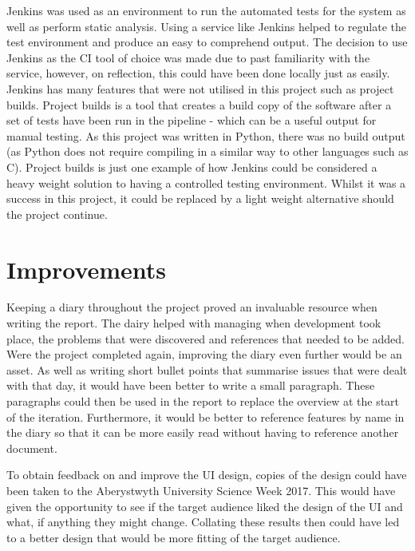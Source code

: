 Jenkins was used as an environment to run the automated tests for the system as well as perform static analysis. Using a service like Jenkins helped to regulate the test environment and produce an easy to comprehend output. The decision to use Jenkins as the CI tool of choice was made due to past familiarity with the service, however, on reflection, this could have been done locally just as easily. Jenkins has many features that were not utilised in this project such as project builds. Project builds is a tool that creates a build copy of the software after a set of tests have been run in the pipeline - which can be a useful output for manual testing. As this project was written in Python, there was no build output (as Python does not require compiling in a similar way to other languages such as C). Project builds is just one example of how Jenkins could be considered a heavy weight solution to having a controlled testing environment. Whilst it was a success in this project, it could be replaced by a light weight alternative should the project continue.

\newpage

\section{Improvements}
Keeping a diary throughout the project proved an invaluable resource when writing the report. The dairy helped with managing when development took place, the problems that were discovered and references that needed to be added. Were the project completed again, improving the diary even further would be an asset. As well as writing short bullet points that summarise issues that were dealt with that day, it would have been better to write a small paragraph. These paragraphs could then be used in the report to replace the overview at the start of the iteration. Furthermore, it would be better to reference features by name in the diary so that it can be more easily read without having to reference another document.

To obtain feedback on and improve the UI design, copies of the design could have been taken to the Aberystwyth University Science Week 2017. This would have given the opportunity to see if the target audience liked the design of the UI and what, if anything they might change. Collating these results then could have led to a better design that would be more fitting of the target audience.


